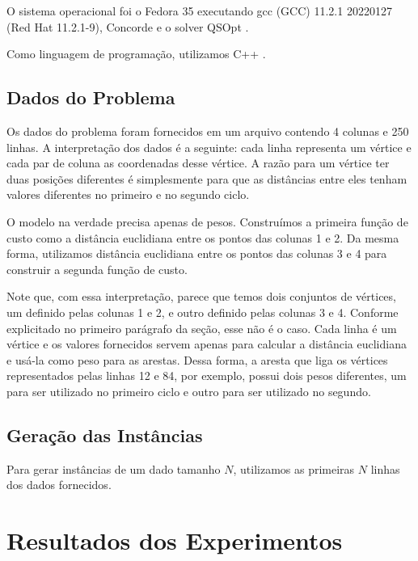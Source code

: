 \documentclass{article}
\newcommand{\abs}[1]{\ensuremath{\left| #1 \right|}}
\newcommand{\vertices}{\ensuremath{V}}
\newcommand{\nvertices}{\ensuremath{\abs{\vertices}}}
\newcommand{\similarity}{\ensuremath{\sigma}}
\newcommand{\lowerbound}{\ensuremath{z_{LB}}}
\newcommand{\upperbound}{\ensuremath{z_{UB}}}
\newcommand{\learningrate}{\ensuremath{\pi}}
\begin{document}
O sistema operacional foi o Fedora 35 executando gcc (GCC) 11.2.1 20220127 (Red Hat 11.2.1-9), Concorde \cite{bib:concorde} e o solver QSOpt \cite{bib:qsopt}.

Como linguagem de programação, utilizamos C++ \cite{bib:cpp}.

\subsection{Dados do Problema}

Os dados do problema foram fornecidos em um arquivo contendo 4 colunas e 250 linhas. A interpretação dos dados é a seguinte: cada linha representa um vértice e cada par de coluna as coordenadas desse vértice. A razão para um vértice ter duas posições diferentes é simplesmente para que as distâncias entre eles tenham valores diferentes no primeiro e no segundo ciclo.

O modelo na verdade precisa apenas de pesos. Construímos a primeira função de custo como a distância euclidiana entre os pontos das colunas 1 e 2. Da mesma forma, utilizamos distância euclidiana entre os pontos das colunas 3 e 4 para construir a segunda função de custo.

Note que, com essa interpretação, parece que temos dois conjuntos de vértices, um definido pelas colunas 1 e 2, e outro definido pelas colunas 3 e 4. Conforme explicitado no primeiro parágrafo da seção, esse não é o caso. Cada linha é um vértice e os valores fornecidos servem apenas para calcular a distância euclidiana e usá-la como peso para as arestas. Dessa forma, a aresta que liga os vértices representados pelas linhas 12 e 84, por exemplo, possui dois pesos diferentes, um para ser utilizado no primeiro ciclo e outro para ser utilizado no segundo.

\subsection{Geração das Instâncias}

Para gerar instâncias de um dado tamanho $N$, utilizamos as primeiras $N$ linhas dos dados fornecidos.

\section{Resultados dos Experimentos}

\end{document}
